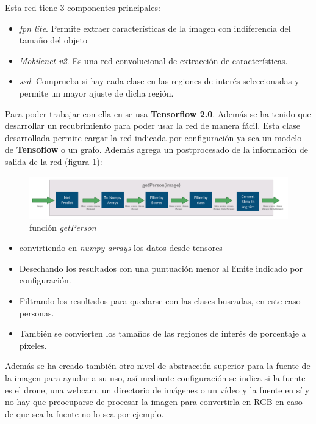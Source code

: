 Esta red tiene 3 componentes principales: 
\begin{itemize}
  \item \textit{\gls{fpn} lite}\cite{fpn}. Permite extraer características de la imagen con indiferencia del tamaño del objeto 
  \item \textit{Mobilenet v2}\cite{mobilenetv2}. Es una red convolucional de extracción de características.
  \item \textit{\gls{ssd}\cite{ssd}}. Comprueba si hay cada clase en las regiones de interés seleccionadas y permite un mayor ajuste de dicha región.
\end{itemize}

Para poder trabajar con ella en se usa \textbf{Tensorflow 2.0}. Además se ha tenido que desarrollar un recubrimiento para poder usar la red de manera fácil.
Esta clase desarrollada permite cargar la red indicada por configuración ya sea un modelo de \textbf{Tensoflow} o un grafo. Además agrega un postprocesado de la información de salida de la red (figura \ref{fig:getPerson}): 
\begin{figure}[H]
  \begin{center}
    \includegraphics[width=1\textwidth]{figures/real/getPerson.png}
		\caption{función \textit{getPerson}}
		\label{fig:getPerson}
		\end{center}
\end{figure}
\begin{itemize}
  \item convirtiendo en \textit{numpy arrays} los datos desde tensores
  \item Desechando los resultados con una puntuación menor al límite indicado por configuración.
  \item Filtrando los resultados para quedarse con las clases buscadas, en este caso personas.
  \item También se convierten los tamaños de las regiones de interés de porcentaje a píxeles.
\end{itemize}

Además se ha creado también otro nivel de abstracción superior para la fuente de la imagen para ayudar a su uso, así mediante configuración se indica si la fuente es el drone, una webcam, un directorio de imágenes o un vídeo y la fuente en sí y no hay que preocuparse de procesar la imagen para convertirla en RGB en caso de que sea la fuente no lo sea por ejemplo.

